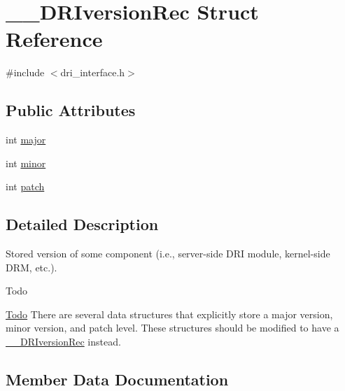\hypertarget{struct_____d_r_iversion_rec}{}\section{\+\_\+\+\_\+\+D\+R\+Iversion\+Rec Struct Reference}
\label{struct_____d_r_iversion_rec}


{\ttfamily \#include $<$dri\+\_\+interface.\+h$>$}

\subsection*{Public Attributes}
\begin{DoxyCompactItemize}
\item 
int \hyperlink{struct_____d_r_iversion_rec_a9cb2a493f978f3f0eb79b5cb5385be6e}{major}
\item 
int \hyperlink{struct_____d_r_iversion_rec_a315635b82bb1a773097074ef6db3481b}{minor}
\item 
int \hyperlink{struct_____d_r_iversion_rec_af1b4ce3ade39632a6d4e0f1ffbb79323}{patch}
\end{DoxyCompactItemize}


\subsection{Detailed Description}
Stored version of some component (i.\+e., server-\/side D\+RI module, kernel-\/side D\+RM, etc.).

\begin{DoxyRefDesc}{Todo}
\item[\hyperlink{todo__todo000001}{Todo}]There are several data structures that explicitly store a major version, minor version, and patch level. These structures should be modified to have a {\ttfamily \hyperlink{struct_____d_r_iversion_rec}{\+\_\+\+\_\+\+D\+R\+Iversion\+Rec}} instead. \end{DoxyRefDesc}


\subsection{Member Data Documentation}
\mbox{\label{struct_____d_r_iversion_rec_a9cb2a493f978f3f0eb79b5cb5385be6e}} 

